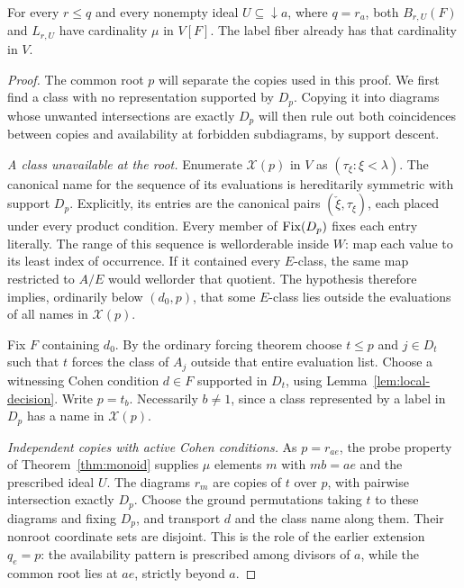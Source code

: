 \begin{lemma}\label{lem:exact-fibers}
For every $r\le q$ and every nonempty ideal
$U\subseteq\downarrow a$, where $q=r_a$, both $B_{r,U}(F)$ and
$L_{r,U}$ have cardinality $\mu$ in $V[F]$. The label fiber already
has that cardinality in $V$.
\end{lemma}
\begin{proof}
The common root $p$ will separate the copies used in this proof.
We first find a class with no representation supported by $D_p$.
Copying it into diagrams whose unwanted intersections are exactly
$D_p$ will then rule out both coincidences between copies and
availability at forbidden subdiagrams, by support descent.

\smallskip\noindent\textit{A class unavailable at the root.}
Enumerate
$\mathcal X(p)$ in $V$ as $(\tau_\xi:\xi<\lambda)$. The canonical
name for the sequence of its evaluations is hereditarily symmetric
with support $D_p$. Explicitly, its entries are the canonical pairs
$(\check\xi,\tau_\xi)$, each placed under every product condition.
Every member of $\operatorname{Fix}(D_p)$ fixes each entry literally. The range
of this sequence is wellorderable inside $W$: map each value to its
least index of occurrence. If it contained every $E$-class, the same
map restricted to $A/E$ would wellorder that quotient. The hypothesis
therefore implies, ordinarily below $(d_0,p)$, that some $E$-class
lies outside the evaluations of all names in $\mathcal X(p)$.

Fix $F$ containing $d_0$. By the ordinary forcing theorem choose
$t\le p$ and $j\in D_t$ such that $t$ forces the class of $A_j$
outside that entire evaluation list. Choose a witnessing Cohen
condition $d\in F$ supported in $D_t$, using
Lemma~\ref{lem:local-decision}. Write $p=t_b$. Necessarily $b\ne1$,
since a class represented by a label in $D_p$ has a name in
$\mathcal X(p)$.

\smallskip\noindent\textit{Independent copies with active Cohen conditions.}
As $p=r_{ae}$, the probe property of Theorem~\ref{thm:monoid}
supplies $\mu$ elements $m$ with $mb=ae$ and the prescribed ideal
$U$. The diagrams $r_m$ are copies of $t$ over $p$, with pairwise
intersection exactly $D_p$. Choose the ground permutations taking
$t$ to these diagrams and fixing $D_p$, and transport $d$ and the
class name along them. Their nonroot coordinate sets are disjoint.
This is the role of the earlier extension $q_e=p$: the availability
pattern is prescribed among divisors of $a$, while the common root
lies at $ae$, strictly beyond $a$.


\end{proof}
